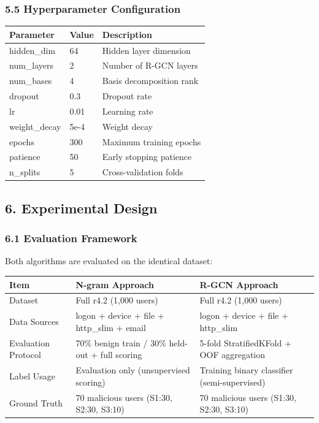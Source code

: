 \documentclass[
  a4paper,
  11pt]{article}
\newcounter{none} %
\begin{document}
\subsubsection{5.5 Hyperparameter
Configuration}\label{55-hyperparameter-configuration}

{\def\LTcaptype{none} %
\begin{longtable}[]{@{}lll@{}}
\toprule\noalign{}
Parameter & Value & Description \\
\midrule\noalign{}
\endhead
\bottomrule\noalign{}
\endlastfoot
hidden\_dim & 64 & Hidden layer dimension \\
num\_layers & 2 & Number of R-GCN layers \\
num\_bases & 4 & Basis decomposition rank \\
dropout & 0.3 & Dropout rate \\
lr & 0.01 & Learning rate \\
weight\_decay & 5e-4 & Weight decay \\
epochs & 300 & Maximum training epochs \\
patience & 50 & Early stopping patience \\
n\_splits & 5 & Cross-validation folds \\
\end{longtable}
}

\subsection{6. Experimental Design}\label{6-experimental-design}

\subsubsection{6.1 Evaluation Framework}\label{61-evaluation-framework}

Both algorithms are evaluated on the identical dataset:

{\def\LTcaptype{none} %
\begin{longtable}[]{@{}lll@{}}
\toprule\noalign{}
Item & N-gram Approach & R-GCN Approach \\
\midrule\noalign{}
\endhead
\bottomrule\noalign{}
\endlastfoot
Dataset & Full r4.2 (1,000 users) & Full r4.2 (1,000 users) \\
Data Sources & logon + device + file + http\_slim + email & logon +
device + file + http\_slim \\
Evaluation Protocol & 70\% benign train / 30\% held-out + full scoring &
5-fold StratifiedKFold + OOF aggregation \\
Label Usage & Evaluation only (unsupervised scoring) & Training binary
classifier (semi-supervised) \\
Ground Truth & 70 malicious users (S1:30, S2:30, S3:10) & 70 malicious
users (S1:30, S2:30, S3:10) \\
\end{longtable}
}
\end{document}
